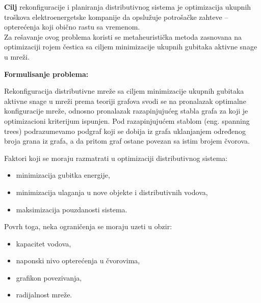 \documentclass[a4paper]{article}
\begin{document}
\textbf{Cilj} rekonfiguracije i planiranja distributivnog sistema je optimizacija ukupnih troškova elektroenergetske kompanije da opslužuje potrošačke zahteve – opterećenja koji obično rastu sa vremenom.\\

Za rešavanje ovog problema koristi se metaheuristička metoda zasnovana na optimizaciji rojem čestica sa ciljem minimizacije ukupnih gubitaka aktivne snage u mreži. 

\vspace{5mm} 

\begin{flushleft}
\textbf{Formulisanje problema:} 
\end{flushleft}

Rekonfiguracija distributivne mreže sa ciljem minimizacije ukupnih gubitaka aktivne snage u mreži prema teoriji grafova svodi se na pronalazak optimalne konfiguracije mreže, odnosno pronalazak razapinjujućeg stabla grafa za koji je optimizacioni kriterijum ispunjen. Pod razapinjujućem stablom (eng. spanning trees) podrazumevamo podgraf koji se dobija iz grafa uklanjanjem određenog broja  grana iz grafa, a da pritom graf ostane povezan sa istim brojem čvorova. 

\vspace{5mm} 

\begin{flushleft}
Faktori koji se moraju razmatrati  u optimizaciji distributivnog sistema:
\end{flushleft}

\begin{itemize}
    \item minimizacija gubitka energije,
    \item minimizacija ulaganja u nove objekte i distributivnih vodova,
    \item maksimizacija pouzdanosti sistema.
\end{itemize}

\begin{flushleft}
Povrh toga, neka ograničenja se moraju uzeti u obzir:
\end{flushleft}

\begin{itemize}
    \item kapacitet vodova,
    \item naponski nivo opterećenja u čvorovima,
    \item grafikon povezivanja,
    \item radijalnost mreže.
\end{itemize}
\end{document}
